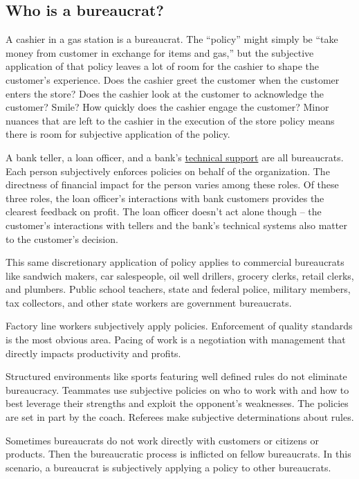 \subsection{Who is a bureaucrat?}

A cashier in a gas station is a bureaucrat. The ``policy'' might simply be ``take money from customer in exchange for items and gas,'' but the subjective application of that policy leaves a lot of room for the cashier to shape the customer's experience. Does the cashier greet the customer when the customer enters the store? Does the cashier look at the customer to acknowledge the customer? Smile? How quickly does the cashier engage the customer? Minor nuances that are left to the cashier in the execution of the store policy means there is room for subjective application of the policy. 

A bank teller, a loan officer, and a bank's \href{https://en.wikipedia.org/wiki/Technical_support}{technical support} are all bureaucrats. Each person subjectively enforces policies on behalf of the organization. The directness of financial impact for the person varies among these roles. Of these three roles, the loan officer's interactions with bank customers provides the clearest feedback on profit. The loan officer doesn't act alone though -- the customer's interactions with tellers and the bank's technical systems also matter to the customer's decision. 


This same discretionary application of policy applies to commercial bureaucrats like sandwich makers, car salespeople, oil well drillers, grocery clerks, retail clerks, and plumbers. Public school teachers, state and federal police, military members, tax collectors, and other state workers are government bureaucrats. 


Factory line workers subjectively apply policies. Enforcement of quality standards is the most obvious area. Pacing of work is a negotiation with management that directly impacts productivity and profits.

Structured environments like sports featuring well defined rules do not eliminate bureaucracy. Teammates use subjective policies on who to work with and how to best leverage their strengths and exploit the opponent's weaknesses. The policies are set in part by the coach. Referees make subjective determinations about rules.

Sometimes bureaucrats do not work directly with customers or citizens or products. Then the bureaucratic process is inflicted on fellow bureaucrats. In this scenario, a bureaucrat is subjectively applying a policy to other bureaucrats. 


